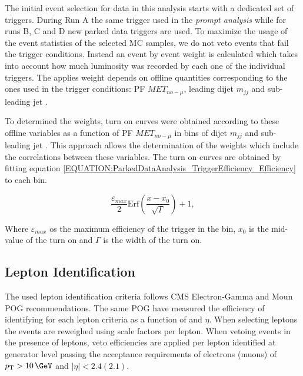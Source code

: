 The initial event selection for data in this analysis starts with a dedicated set of triggers. During Run A the same trigger used in the \textit{prompt analysis} while for runs B, C and D new parked data triggers are used. To maximize the usage of the event statistics of the selected \gls{MC} samples, we do not veto events that fail the trigger conditions. Instead an event by event weight is calculated which takes into account how much luminosity was recorded by each one of the individual triggers. The applies weight depends on offline quantities corresponding to the ones used in the trigger conditions: \gls{PF} $MET_{no-\mu}$, leading dijet $m_{jj}$ and sub-leading jet \pt. 

To determined the weights, turn on curves were obtained according to these offline variables as a function of \gls{PF} $MET_{no-\mu}$ in bins of dijet $m_{jj}$ and sub-leading jet \pt. This approach allows the determination of the weights which include the correlations between these variables. The turn on curves are obtained by fitting equation \ref{EQUATION:ParkedDataAnalysis_TriggerEfficiency_Efficiency} to each bin.

\begin{equation}
\frac{\varepsilon_{max}}{2}\text{Erf}\left(\frac{x-x_{0}}{\sqrt{\Gamma}}\right)+1,
\label{EQUATION:ParkedDataAnalysis_TriggerEfficiency_Efficiency} 
\end{equation}

Where $\varepsilon_{max}$ os the maximum efficiency of the trigger in the bin, $x_{0}$ is the mid-value of the turn on and $\Gamma$ is the width of the turn on.

\subsection{Lepton Identification}


The used lepton identification criteria follows \gls{CMS} Electron-Gamma and Moun \gls{POG} recommendations. The same \gls{POG} have measured the efficiency of identifying for each lepton criteria as a function of \pt and $\eta$. When selecting leptons the events are reweighed using scale factors per lepton. When vetoing events in the presence of leptons, veto efficiencies are applied per lepton identified at generator level passing the acceptance requirements of electrons (muons) of $\pt>10\,\GeV$ and $|\eta|<2.4(2.1)$.

